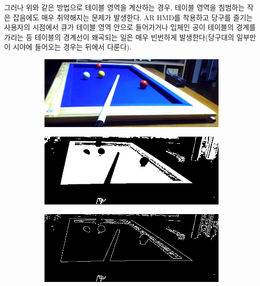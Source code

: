 \documentclass[10pt]{oblivoir}
\begin{document}
그러나 위와 같은 방법으로 테이블 영역을 계산하는 경우, 테이블 영역을 침범하는 작은 잡음에도 매우 취약해지는 문제가 발생한다. AR HMD를 착용하고 당구를 즐기는 사용자의 시점에서 큐가 테이블 영역 안으로 들어가거나 입체인 공이 테이블의 경계를 가리는 등 테이블의 경계선이 왜곡되는 일은 매우 빈번하게 발생한다(당구대의 일부만이 시야에 들어오는 경우는 뒤에서 다룬다).

\begin{figure}[ht]
    \centering
    \begin{subfigure}{8cm}
        \includegraphics[width=\textwidth]{img/billiards-table-low-angle.png}
        \caption{}
        \label{fig;table-lowangle-src}
    \end{subfigure}
    \centering
    \begin{subfigure}{8cm}
        \includegraphics[width=\textwidth]{img/billiards-table-low-angle-flt.png}
        \caption{}
        \label{fig;table-lowangle-flt}
    \end{subfigure}
    \centering
    \begin{subfigure}{8cm}
        \includegraphics[width=\textwidth]{img/billiards-table-low-angle-edge.png}

\end{subfigure}
\end{figure}
\end{document}
